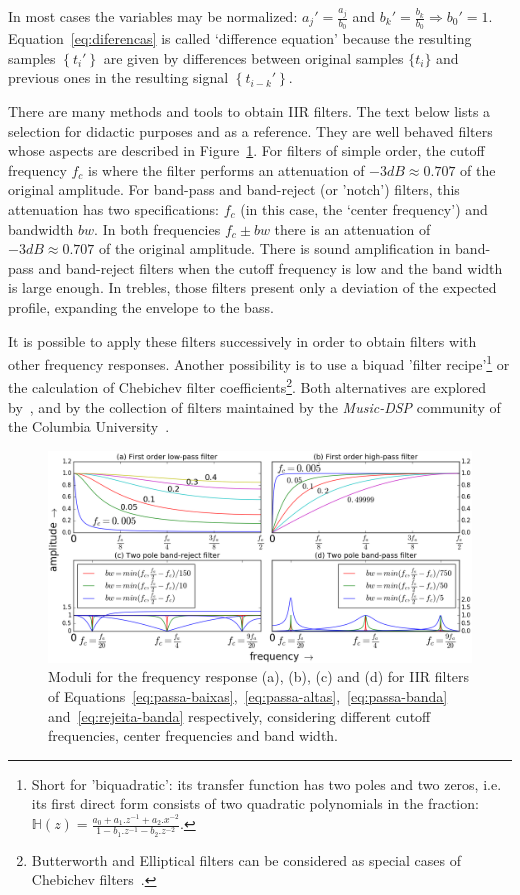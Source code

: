 In most cases the variables may be normalized: $a_j'=\frac{a_j}{b_0}$ and $b_k'=\frac{b_k}{b_0} \Rightarrow b_0' = 1$.
Equation~\ref{eq:diferencas} is called `difference equation' because the resulting samples $\left\{t_i'\right\}$ are given by differences between original samples $\{t_i\}$ and previous ones in the resulting signal $\left\{t_{i-k}'\right\}$.

There are many methods and tools to obtain IIR filters. The text below lists a selection for didactic purposes and as a reference. They are well behaved filters whose aspects are described in Figure~\ref{fig:iir}. For filters of simple order, the cutoff frequency $f_c$ is where the filter performs an attenuation of $-3dB \approx 0.707 $ of the original amplitude.
For band-pass and band-reject (or 'notch') filters, this attenuation has two specifications: $f_c$ (in this case, the `center frequency') and bandwidth $bw$. In both frequencies $f_c \pm bw$ there is an attenuation of $-3dB \approx 0.707$ of the original amplitude.
There is sound amplification in band-pass and band-reject filters when the cutoff frequency is low and the band width is large enough. In trebles, those filters present only a deviation of the expected profile, expanding the envelope to the bass.

It is possible to apply these filters successively in order to obtain filters with other frequency responses. Another possibility is to use a biquad 'filter recipe'\footnote{Short for 'biquadratic': its transfer function has two poles and two zeros, i.e. its first direct form consists of two quadratic polynomials in the fraction: $\mathbb{H}(z)=\frac{a_0+a_1.z^{-1}+a_2.x^{-2}}{1- b_1.z^{-1} -b_2 . z^{-2}}$.} or the calculation of Chebichev filter coefficients\footnote{Butterworth and Elliptical filters can be considered as special cases of Chebichev filters~\cite{Openheim,smith}.}.
Both alternatives are explored by~\cite{JOSFM,smith}, and by the collection of filters maintained by the \emph{Music-DSP} community of the Columbia University~\cite{music-dsp,Openheim}.

\begin{figure}
    \centering
        \includegraphics[width=\textwidth]{figures/iir__}
    \caption{Moduli for the frequency response (a), (b), (c) and (d) for IIR filters of Equations~\ref{eq:passa-baixas},~\ref{eq:passa-altas},~\ref{eq:passa-banda} and~\ref{eq:rejeita-banda} respectively, considering different cutoff frequencies, center frequencies and band width.}
        \label{fig:iir}
\end{figure}

